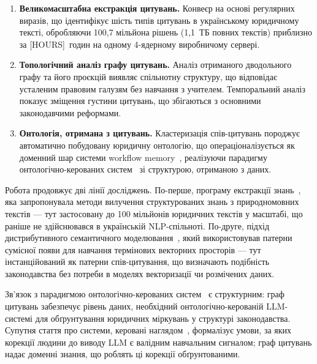 \documentclass[11pt]{article}
\begin{document}
\begin{enumerate}[leftmargin=*, nosep]
  \item \textbf{Великомасштабна екстракція цитувань.} Конвеєр на основі регулярних виразів, що ідентифікує шість типів цитувань в українському юридичному тексті, обробляючи 100,7 мільйона рішень (1,1~ТБ повних текстів) приблизно за [HOURS]~годин на одному 4-ядерному виробничому сервері.

  \item \textbf{Топологічний аналіз графу цитувань.} Аналіз отриманого дводольного графу та його проєкцій виявляє спільнотну структуру, що відповідає усталеним правовим галузям без навчання з учителем. Темпоральний аналіз показує зміщення густини цитувань, що збігаються з основними законодавчими реформами.

  \item \textbf{Онтологія, отримана з цитувань.} Кластеризація спів-цитувань породжує автоматично побудовану юридичну онтологію, що операціоналізується як доменний шар системи workflow memory~\citep{ovcharov2026workflowmemory}, реалізуючи парадигму онтологічно-керованих систем~\citep{palagin2006architecture} зі структурою, отриманою з даних.
\end{enumerate}

Робота продовжує дві лінії досліджень.
По-перше, програму екстракції знань~\citet{palagin2012knowledge}, яка запропонувала методи вилучення структурованих знань з природномовних текстів --- тут застосовану до 100 мільйонів юридичних текстів у масштабі, що раніше не здійснювався в українській NLP-спільноті.
По-друге, підхід дистрибутивного семантичного моделювання~\citet{palagin2020distributional}, який використовував патерни сумісної появи для навчання термінових векторних просторів --- тут інстанційований як патерни спів-цитування, що визначають подібність законодавства без потреби в моделях векторизації чи розмічених даних.

Зв'язок з парадигмою онтологічно-керованих систем~\citep{palagin2006architecture,palagin2023ontochatgpt} є структурним: граф цитувань забезпечує рівень даних, необхідний онтологічно-керованій LLM-системі для обґрунтування юридичних міркувань у структурі законодавства.
Супутня стаття про системи, керовані наглядом~\citep{ovcharov2026bridge}, формалізує умови, за яких корекції людини до виводу LLM є валідним навчальним сигналом; граф цитувань надає доменні знання, що роблять ці корекції обґрунтованими.


\end{document}
